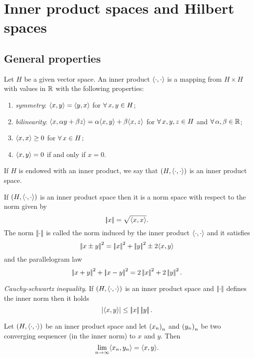 \documentclass{article}
\begin{document}
\section{Inner product spaces and Hilbert spaces}
\subsection{General properties}
\begin{definition}
	Let $H$ be a given vector space. An inner product $\langle \cdot,\cdot \rangle$ is a mapping from $H\times H$ with values in $\mathbb{R}$ with the following properties:
	\begin{enumerate}
		\item \emph{symmetry}: $\langle x,y \rangle=\langle y,x \rangle$ for $\forall\, x,y\in H$;
		\item \emph{bilinearity}: $\langle x,\alpha y+\beta z \rangle=\alpha\langle x,y \rangle+\beta\langle x,z \rangle$ for $\forall\, x,y,z\in H$ and $\forall\,\alpha,\beta\in\mathbb{R}$;
		\item $\langle x,x \rangle\geq0$ for $\forall\, x\in H$;
		\item $\langle x,y \rangle=0$ if and only if $x=0$. 
	\end{enumerate}
	If $H$ is endowed with an inner product, we say that $\left(H,\langle \cdot,\cdot \rangle\right)$ is an inner product space.
\end{definition}
\begin{proposition}
	If $\left(H,\langle \cdot,\cdot \rangle\right)$ is an inner product space then it is a norm space with respect to the norm given by
	\begin{equation*}
		\left|\negthinspace\left|x\right|\negthinspace\right|=\sqrt{\langle x,x \rangle}.
	\end{equation*}
	The norm $\left|\negthinspace\left|\cdot\right|\negthinspace\right|$ is called the norm induced by the inner product $\langle \cdot,\cdot \rangle$ and it satisfies
	\begin{equation*}
		\left|\negthinspace\left|x\pm y\right|\negthinspace\right|^{2}=\left|\negthinspace\left|x\right|\negthinspace\right|^{2}+\left|\negthinspace\left|y\right|\negthinspace\right|^{2}\pm 2\langle x,y \rangle
	\end{equation*}
	and the parallelogram law
	\begin{equation*}
		\norm{x+y}^{2}+\norm{x-y}^{2}=2\norm{x}^{2}+2\norm{y}^{2}.
	\end{equation*}
\end{proposition}
\begin{proposition}
	\emph{Cauchy-schwartz inequality}. If $\left(H,\langle \cdot,\cdot \rangle\right)$ is an inner product space and $\left|\negthinspace\left|\cdot\right|\negthinspace\right|$ defines the inner norm then it holds
	\begin{equation*}
		\left|\langle x,y \rangle\right|\leq\left|\negthinspace\left|x\right|\negthinspace\right|\left|\negthinspace\left|y\right|\negthinspace\right|.
	\end{equation*}
\end{proposition}
\begin{proposition}
	Let $\left(H,\langle \cdot,\cdot \rangle\right)$ be an inner product space and let ${\left({x}_{n}\right)}_{n}$ and ${\left({y}_{n}\right)}_{n}$ be two converging sequencer (in the inner norm) to $x$ and $y$. Then
	\begin{equation*}
		\lim_{n\to\infty}\langle x_{n},y_{n} \rangle=\langle x,y \rangle.
	\end{equation*}
\end{proposition}
\end{document}
